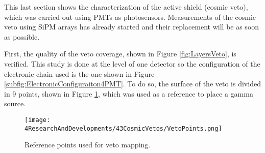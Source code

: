 This last section shows the characterization of the active shield (cosmic veto), which was carried out using PMTs as photosensors. Measurements of the cosmic veto using SiPM arrays has already started and their replacement will be as soon as possible. 

First, the quality of the veto coverage, shown in Figure \ref{fig:LayersVeto}, is verified. This study is done at the level of one detector so the configuration of the electronic chain used is the one shown in Figure \ref{subfig:ElectronicConfiguraiton4PMT}. To do so, the surface of the veto is divided in 9 points, shown in Figure \ref{fig:MappingPoints}, which was used as a reference to place a gamma source.

\begin{figure}[h]
\centering
\texttt{[image: 4ResearchAndDevelopments/43CosmicVetos/VetoPoints.png]}
\caption{Reference points used for veto mapping.\label{fig:MappingPoints}}
\end{figure}

